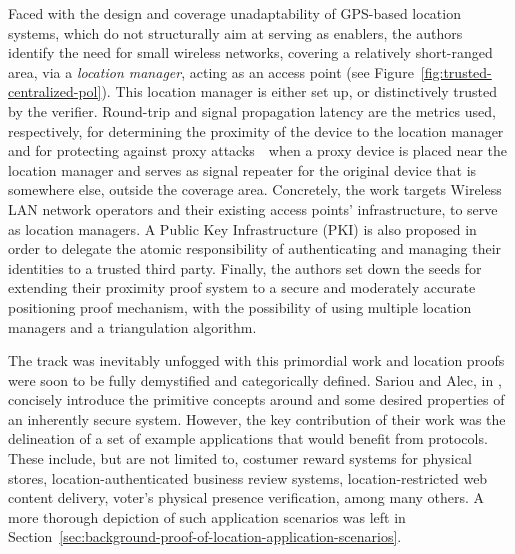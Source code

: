 Faced with the design and coverage unadaptability of GPS-based location systems, which do not structurally aim at serving as \pol{} enablers, the authors identify the need for small wireless networks, covering a relatively short-ranged area, via a \emph{location manager}, acting as an access point (see Figure~\ref{fig:trusted-centralized-pol}). This location manager is either set up, or distinctively trusted by the verifier. Round-trip and signal propagation latency are the metrics used, respectively, for determining the proximity of the device to the location manager and for protecting against proxy attacks~\textemdash~when a proxy device is placed near the location manager and serves as signal repeater for the original device that is somewhere else, outside the coverage area. Concretely, the work targets Wireless LAN network operators and their existing access points' infrastructure, to serve as location managers. A Public Key Infrastructure (PKI) is also proposed in order to delegate the atomic responsibility of authenticating and managing their identities to a trusted third party. Finally, the authors set down the seeds for extending their proximity proof system to a secure and moderately accurate positioning proof mechanism, with the possibility of using multiple location managers and a triangulation algorithm.

The \pol{} track was inevitably unfogged with this primordial work and location proofs were soon to be fully demystified and categorically defined. Sariou and Alec, in \cite{saroiu2009enabling}, concisely introduce the primitive concepts around \pol{} and some desired properties of an inherently secure system. However, the key contribution of their work was the delineation of a set of example applications that would benefit from \pol{} protocols. These include, but are not limited to, costumer reward systems for physical stores, location-authenticated business review systems, location-restricted web content delivery, voter's physical presence verification, among many others. A more thorough depiction of such application scenarios was left in Section~\ref{sec:background-proof-of-location-application-scenarios}.

